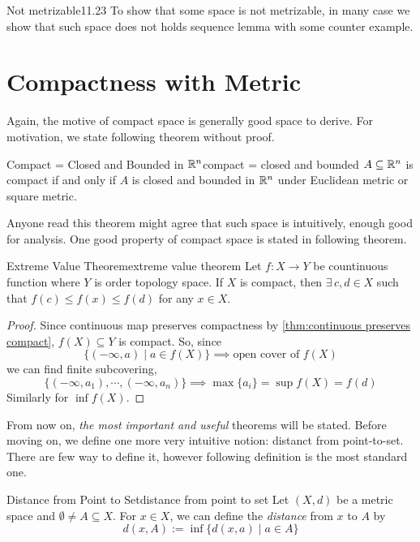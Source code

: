 \documentclass[12pt, a4paper, twoside]{article}
\theoremstyle{plain}
\begin{document}
\begin{rem}{Not metrizable}{11.23}
    To show that some space is not metrizable, in many case we show that 
    such space does not holds sequence lemma with some counter example. 
\end{rem}

\newpage 

\section{Compactness with Metric}

Again, the motive of compact space is generally good space to derive. 
For motivation, we state following theorem without proof. 

\begin{thm}{Compact = Closed and Bounded in ${\mathbb {R}}^n$}{compact = closed and bounded}
    $A \subseteq {\mathbb {R}}^n$ is compact if and only if $A$ is closed and bounded in ${\mathbb {R}}^n$ 
    under Euclidean metric or square metric.
\end{thm}

Anyone read this theorem might agree that such space is intuitively, enough good for analysis. 
One good property of compact space is stated in following theorem. 

\begin{thm}{Extreme Value Theorem}{extreme value theorem}
    Let $f: X \rightarrow Y$ be countinuous function where $Y$ is order topology space. 
    If $X$ is compact, then $\exists \, c, d \in X$ such that $f(c) \leq f(x) \leq f(d)$ for any $x \in X$. 
\end{thm}

\begin{proof}
    Since continuous map preserves compactness by \ref{thm:continuous preserves compact}, 
    $f(X) \subseteq Y$ is compact. So, since 
    \[\{(-\infty, a) \mid a \in f(X)\} \implies \text{open cover of $f(X)$}\]
    we can find finite subcovering, 
    \[\{(-\infty, a_1), \cdots, (-\infty, a_n)\} \implies \max\{a_i\} = \sup f(X) = f(d)\]
    Similarly for $\inf f(X)$. 
\end{proof}

From now on, \textit{the most important and useful} theorems will be stated. 
Before moving on, we define one more very intuitive notion: distanct from point-to-set. 
There are few way to define it, however following definition is the most standard one. 

\begin{defn}{Distance from Point to Set}{distance from point to set}
    Let $(X, d)$ be a metric space and $\emptyset \neq A \subseteq X$. 
    For $x \in X$, we can define the \textit{distance} from $x$ to $A$ by 
    \[d(x, A) := \inf \{d(x, a) \mid a \in A\}\]
\end{defn}
\end{document}
